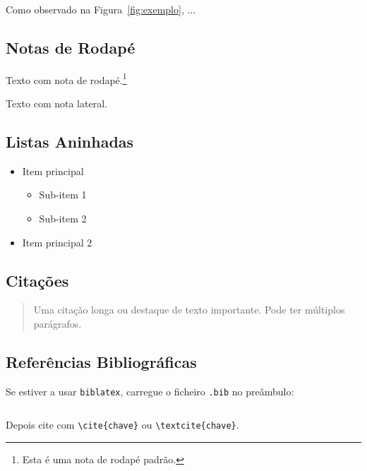 \documentclass[
  a4paper,
  12pt
]{DPQISTreport}
\begin{document}
Como observado na Figura~\ref{fig:exemplo}, ...

\subsection{Notas de Rodapé}

Texto com nota de rodapé.\footnote{Esta é uma nota de rodapé padrão.}

Texto com nota lateral.

\subsection{Listas Aninhadas}

\begin{itemize}
    \item Item principal
    \begin{itemize}
        \item Sub-item 1
        \item Sub-item 2
    \end{itemize}
    \item Item principal 2
\end{itemize}

\subsection{Citações}

\begin{quote}
    Uma citação longa ou destaque de texto importante. Pode ter múltiplos parágrafos.
\end{quote}

\subsection{Referências Bibliográficas}

Se estiver a usar \verb|biblatex|, carregue o ficheiro \verb|.bib| no preâmbulo:

\begin{verbatim}

\end{verbatim}

Depois cite com \verb|\cite{chave}| ou \verb|\textcite{chave}|.

\newpage

\end{document}
